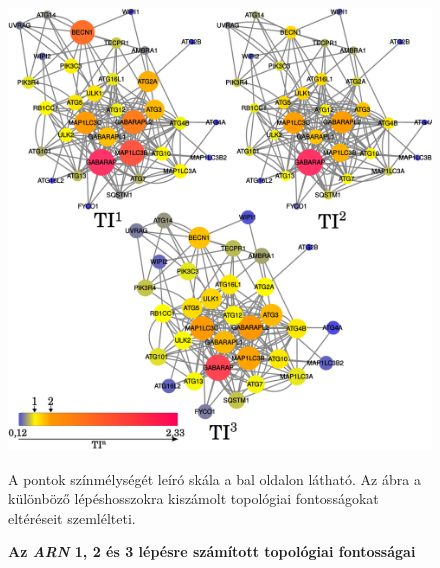 \documentclass[a4paper,12pt]{article}
\newenvironment{imgdesc}{
		\small
		\singlespacing
		\begin{center}
		
	}{
		\end{center}	
	}
\begin{document}
				\begin{figure}[H]
					\includegraphics[scale=0.5]{img/arn_123_comp.pdf}
					\centering
					\caption{ \textbf{Az \textit{ARN} 1, 2 és 3 lépésre számított topológiai fontosságai}}
					\begin{imgdesc}
						A pontok színmélységét leíró skála a bal oldalon látható. Az ábra a különböző lépéshosszokra kiszámolt topológiai fontosságokat eltéréseit szemlélteti.
					\end{imgdesc}
		
					\label{fig:arn123}			 		 
				\end{figure}
				
\end{document}
